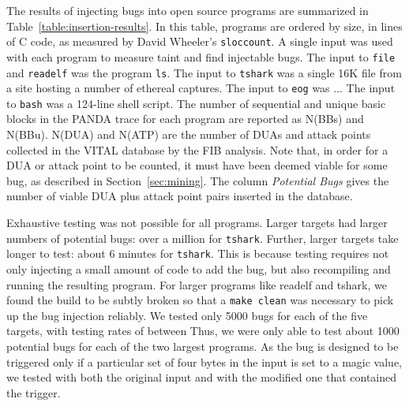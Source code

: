 The results of injecting bugs into open source programs are summarized in Table~\ref{table:insertion-results}.
In this table, programs are ordered by size, in lines of C code, as measured by David Wheeler's \verb+sloccount+. 
A single input was used with each program to measure taint and find injectable bugs.
The input to \verb+file+ and \verb+readelf+ was the program \verb+ls+.
The input to \verb+tshark+ was a single 16K file from a site hosting a number of ethereal captures. %
The input to \verb+eog+ was ... 
The input to \verb+bash+ was a 124-line shell script.
The number of sequential and unique basic blocks in the PANDA trace for each program are reported as N(BBs) and N(BBu).
N(DUA) and N(ATP) are the number of DUAs and attack points collected in the VITAL database by the FIB analysis.
Note that, in order for a DUA or attack point to be counted, it must have been deemed viable for some bug, as described in Section~\ref{sec:mining}.
The column \emph{Potential Bugs} gives the number of viable DUA plus attack point pairs inserted in the database.

Exhaustive testing was not possible for all programs.  
Larger targets had larger numbers of potential bugs: over a million for \verb+tshark+.
Further, larger targets take longer to test: about 6 minutes for \verb+tshark+.
This is because testing requires not only injecting a small amount of code to add the bug, but also recompiling and running the resulting program.
For larger programs like readelf and tshark, we found the build to be subtly broken so that a \verb+make clean+ was necessary to pick up the bug injection reliably.
We tested only 5000 bugs for each of the five targets, with testing rates of between 
Thus, we were only able to test about 1000 potential bugs for each of the two largest programs. 
As the bug is designed to be triggered only if a particular set of four bytes in the input is set to a magic value, we tested with both the original input and with the modified one that contained the trigger. 

